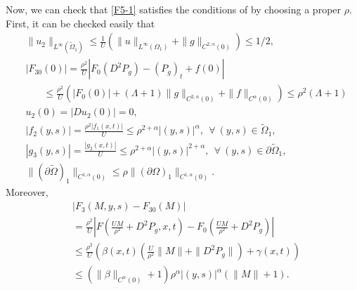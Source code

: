 \documentclass[preprint,12pt]{elsarticle}
\theoremstyle{definition}
\theoremstyle{remark}
\numberwithin{equation}{section}
\begin{document}
Now, we can check that \cref{F5-1} satisfies the conditions of  by choosing a proper $\rho$. First, it can be checked easily that
\begin{equation*}
  \begin{aligned}
  & \|u_2\|_{L^{\infty}(\tilde{\Omega}_1)}
  \leq \frac{1}{U}\left(\|u\|_{L^{\infty}(\Omega_1)}+\|g\|_{C^{2,\alpha}(0)}
  \right)\leq 1/2,\\
&|F_{30}(0)|=\frac{\rho^2}{U}\left|F_0(D^2P_g)-(P_g)_t+f(0)\right|\\
&~~~~~~~~\leq \frac{\rho^2}{U}\left(|F_0(0)|+(\Lambda+1)\|g\|_{C^{2,\alpha}(0)}+\|f\|_{C^{\alpha}(0)}\right)
\leq \rho^2\left(\Lambda+1\right)\\
  &u_2(0)=|Du_2(0)|=0,\\
  &|f_2(y,s)|= \frac{\rho^2|f_1(x,t)|}{U}\leq \rho^{2+\alpha}|(y,s)|^{\alpha},~~\forall ~(y,s)\in\tilde{\Omega}_1,\\
  &|g_3(y,s)|=\frac{|g_2(x,t)|}{U}
  \leq \rho^{2+\alpha}|(y,s)|^{2+\alpha},~~\forall ~(y,s)\in\partial \tilde{\Omega}_1,\\
  & \|(\partial \tilde{\Omega})_1\|_{C^{1,\alpha}(0)} \leq \rho\|(\partial \Omega)_1\|_{C^{1,\alpha}(0)}.
  \end{aligned}
\end{equation*}
Moreover,
\begin{equation*}
  \begin{aligned}
    &|F_3(M,y,s)-F_{30}(M)|\\
    &=\frac{\rho^2}{U} \left|F\left(\frac{UM}{\rho^2}+D^2P_g,x,t\right)
    -F_0\left(\frac{UM}{\rho^2}+D^2P_g\right)\right|\\
&\leq \frac{\rho^2}{U} \left(\beta(x,t)\left(\frac{U}{\rho^2}\|M\|+\|D^2P_g\|\right)+\gamma(x,t)\right)\\
&\leq \left(\|\beta\|_{C^{\alpha}(0)}+1\right)\rho^{\alpha}|(y,s)|^{\alpha}(\|M\|+1).
  \end{aligned}
\end{equation*}
\end{document}
